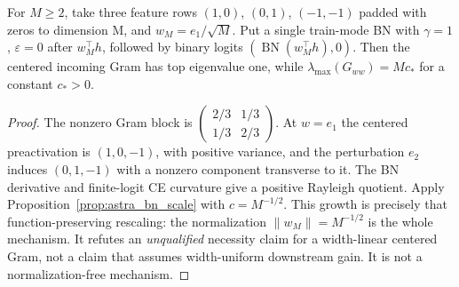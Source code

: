 \begin{proposition}
\label{prop:astra_center_counter}
For $M\ge2$, take three feature rows $(1,0)$, $(0,1)$, $(-1,-1)$ padded
with zeros to dimension M, and $w_M=e_1/\sqrt M$. Put a single train-mode
BN with $\gamma=1$, $\varepsilon=0$ after $w_M^\top h$, followed by
binary logits $(\operatorname{BN}(w_M^\top h),0)$. Then the centered
incoming Gram has top eigenvalue one, while
$\lambda_{\max}(G_{ww})=M c_*$ for a constant $c_*>0$.
\end{proposition}
\begin{proof}
The nonzero Gram block is
$\left(\begin{smallmatrix}2/3&1/3\\1/3&2/3\end{smallmatrix}\right)$.
At $w=e_1$ the centered preactivation is $(1,0,-1)$, with positive
variance, and the perturbation $e_2$ induces $(0,1,-1)$ with a
nonzero component transverse to it. The BN derivative and finite-logit
CE curvature give a positive Rayleigh quotient. Apply
Proposition~\ref{prop:astra_bn_scale} with $c=M^{-1/2}$.
This growth is precisely that function-preserving rescaling: the
normalization $\|w_M\|=M^{-1/2}$ is the whole mechanism. It refutes
an \emph{unqualified} necessity claim for a width-linear centered Gram,
not a claim that assumes width-uniform downstream gain. It is not a
normalization-free mechanism.
\end{proof}

